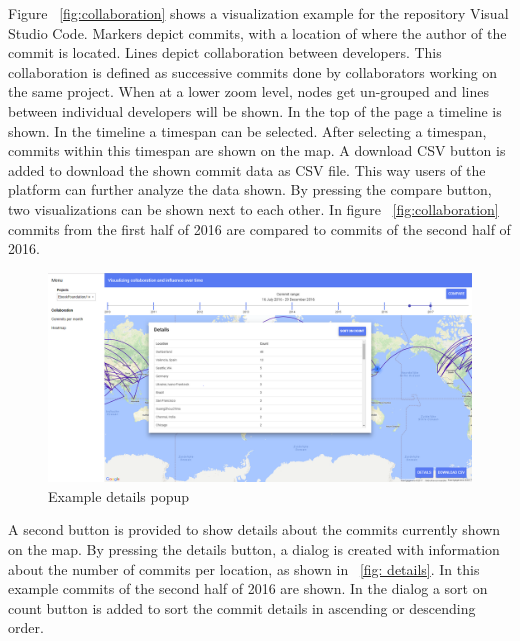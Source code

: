 \documentclass[acmtog, authorversion]{acmart}
\begin{document}
Figure ~\ref{fig:collaboration} shows a visualization example for the repository Visual Studio Code.
Markers depict commits, with a location of where the author of the commit is located.
Lines depict collaboration between developers.
This collaboration is defined as successive commits done by collaborators working on the same project.
When at a lower zoom level, nodes get un-grouped and lines between individual developers will be shown.
In the top of the page a timeline is shown.
In the timeline a timespan can be selected.
After selecting a timespan, commits within this timespan are shown on the map.
A download CSV button is added to download the shown commit data as CSV file.
This way users of the platform can further analyze the data shown.
By pressing the compare button, two visualizations can be shown next to each other.
In figure  ~\ref{fig:collaboration} commits from the first half of 2016 are compared to commits of the second half of 2016.
\begin{figure}
\includegraphics[scale=0.18]{images/details-popup-ebook-foundation.PNG}
\caption{Example details popup}
\label{fig:details}
\end{figure}

A second button is provided to show details about the commits currently shown on the map. 
By pressing the details button, a dialog is created with information about the number of commits per location, as shown in ~\ref{fig: details}.
In this example commits of the second half of 2016 are shown. 
In the dialog a sort on count button is added to sort the commit details in ascending or descending order.
\end{document}
